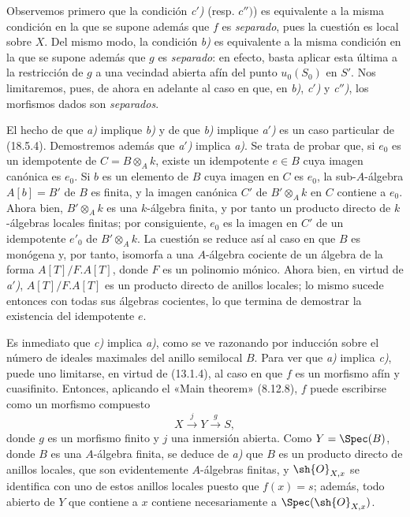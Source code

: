 Observemos primero que la condición \emph{c$'$)} (resp. $c'')$) es equivalente a la misma condición en la que se supone además que $f$ es \emph{separado}, pues la cuestión es local sobre $X$. Del mismo modo, la condición \emph{b)} es equivalente a la misma condición en la que se supone además que $g$ es \emph{separado}: en efecto, basta aplicar esta última a la restricción de $g$ a una vecindad abierta afín del punto $u_0(S_0)$ en $S'$. Nos limitaremos, pues, de ahora en adelante al caso en que, en \emph{b)}, \emph{c$'$)} y \emph{c$''$)}, los morfismos dados son \emph{separados}.

El hecho de que \emph{a)} implique \emph{b)} y de que \emph{b)} implique \emph{a$'$)} es un caso particular de (18.5.4). Demostremos además que \emph{a$'$)} implica \emph{a)}. Se trata de probar que, si $e_0$ es un idempotente de $C=B\otimes_A k$, existe un idempotente $e\in B$ cuya imagen canónica es $e_0$. Si $b$ es un elemento de $B$ cuya imagen en $C$ es $e_0$, la sub-$A$-álgebra $A[b]=B'$ de $B$ es finita, y la imagen canónica $C'$ de $B'\otimes_A k$ en $C$ contiene a $e_0$. Ahora bien, $B'\otimes_A k$ es una $k$-álgebra finita, y por tanto un producto directo de $k$-álgebras locales finitas; por consiguiente, $e_0$ es la imagen en $C'$ de un idempotente $e'_0$ de $B'\otimes_A k$. La cuestión se reduce así al caso en que $B$ es monógena y, por tanto, isomorfa a una $A$-álgebra cociente de un álgebra de la forma $A[T]/F.A[T]$, donde $F$ es un polinomio mónico. Ahora bien, en virtud de \emph{a$'$)}, $A[T]/F.A[T]$ es un producto directo de anillos locales; lo mismo sucede entonces con todas sus álgebras cocientes, lo que termina de demostrar la existencia del idempotente $e$.

Es inmediato que \emph{c)} implica \emph{a)}, como se ve razonando por inducción sobre el número de ideales maximales del anillo semilocal $B$. Para ver que \emph{a)} implica \emph{c)}, puede uno limitarse, en virtud de (13.1.4), al caso en que $f$ es un morfismo afín y cuasifinito. Entonces, aplicando el «Main theorem» (8.12.8), $f$ puede escribirse como un morfismo compuesto
\[
  X\xrightarrow{j}Y\xrightarrow{g}S,
\]
donde $g$ es un morfismo finito y $j$ una inmersión abierta. Como $Y=\Spec(B)$, donde $B$ es una $A$-álgebra finita, se deduce de \emph{a)} que $B$ es un producto directo de anillos locales, que son evidentemente $A$-álgebras finitas, y $\sh{O}_{X,x}$ se identifica con uno de estos anillos locales puesto que $f(x)=s$; además, todo abierto de $Y$ que contiene a $x$ contiene necesariamente a $\Spec(\sh{O}_{X,x})$.

